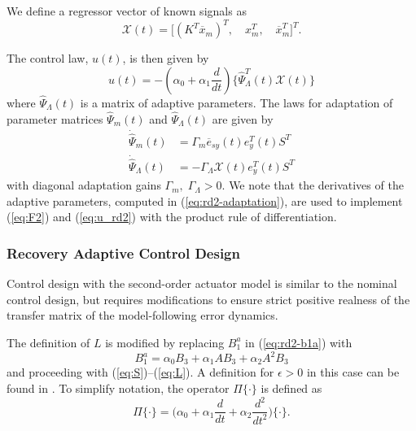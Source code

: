 \documentclass[english]{ifacconf}
\begin{document}
We define a regressor vector of known signals as
\begin{equation}
\mathcal{X}(t) = \big[ (K^T \overline{x}_m)^T,\quad x_m^T,\quad \overline{x}_m^T \big]^T.
\end{equation}

The control law, $u(t)$, is then given by
\begin{equation}
u(t) = - (\alpha_0 + \alpha_1 \frac{d}{dt}) \big \{ \hat{\Psi}_{\Lambda}^T (t) \mathcal{X}(t) \big\} \label{eq:u_rd2}	
\end{equation}
where $\hat{\Psi}_{\Lambda}(t)$ is a matrix of adaptive parameters. The laws for adaptation of parameter matrices $\hat{\Psi}_m(t)$ and $\hat{\Psi}_{\Lambda}(t)$ are given by
\begin{equation}
\begin{aligned}
	\dot{\hat{\Psi}}_m(t) &= \Gamma_{m} \overline{e}_{sy}(t) e_y^T(t) S^T \\
	\dot{\hat{\Psi}}_{\Lambda}(t) &= -\Gamma_{\Lambda} \mathcal{X}(t) e_y^T (t) S^T
\end{aligned} \label{eq:rd2-adaptation}
\end{equation}
with diagonal adaptation gains $\Gamma_{m}, \;\Gamma_{\Lambda} > 0$. We note that the derivatives of the adaptive parameters, computed in (\ref{eq:rd2-adaptation}), are used to implement (\ref{eq:F2}) and (\ref{eq:u_rd2}) with the product rule of differentiation.

\subsubsection{Recovery Adaptive Control Design}
Control design with the second-order actuator model is similar to the nominal control design, but requires modifications to ensure strict positive realness of the transfer matrix of the model-following error dynamics. 

The definition of $L$ is modified by replacing $B_1^a$ in (\ref{eq:rd2-b1a}) with
\begin{equation}
B_1^a = \alpha_0 B_3 + \alpha_1 A B_3 + \alpha_2 A^2 B_3 \label{eq:rd3-b1a}
\end{equation}
and proceeding with (\ref{eq:S})--(\ref{eq:L}). A definition for $\epsilon>0$ in this case can be found in \cite{qu2016phd}. To simplify notation, the operator $\Pi \{\cdot \}$ is defined as
\begin{equation}
\Pi \{ \cdot \} = \big( \alpha_0 + \alpha_1 \frac{d}{dt} + \alpha_2 \frac{d^2}{dt^2} \big) \{ \cdot \}.
\end{equation}
\end{document}
